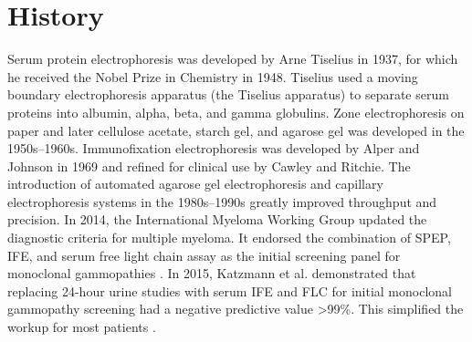 \section*{History}
Serum protein electrophoresis was developed by Arne Tiselius in 1937, for which he received the Nobel Prize in Chemistry in 1948. Tiselius used a moving boundary electrophoresis apparatus (the Tiselius apparatus) to separate serum proteins into albumin, alpha, beta, and gamma globulins. Zone electrophoresis on paper and later cellulose acetate, starch gel, and agarose gel was developed in the 1950s--1960s. Immunofixation electrophoresis was developed by Alper and Johnson in 1969 and refined for clinical use by Cawley and Ritchie. The introduction of automated agarose gel electrophoresis and capillary electrophoresis systems in the 1980s--1990s greatly improved throughput and precision. In 2014, the International Myeloma Working Group updated the diagnostic criteria for multiple myeloma. It endorsed the combination of SPEP, IFE, and serum free light chain assay as the initial screening panel for monoclonal gammopathies \cite{rajkumar2014international}. In 2015, Katzmann et al. demonstrated that replacing 24-hour urine studies with serum IFE and FLC for initial monoclonal gammopathy screening had a negative predictive value >99\%. This simplified the workup for most patients \cite{katzmann2009screening}.

